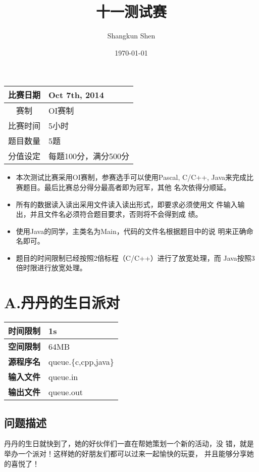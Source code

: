 \documentclass{article}
\title{十一测试赛}
\author{Shangkun Shen}
\date{\today}
\newcommand\artdate{Oct 7th, 2014}
\begin{document}
\maketitle
\begin{longtable}{|c|l|}
 \hline 比赛日期 & \artdate \\
 \hline 赛制 & OI赛制 \\
 \hline 比赛时间 & 5小时 \\
 \hline 题目数量 & 5题 \\
 \hline 分值设定 & 每题100分，满分500分 \\
 \hline
\end{longtable}
\thispagestyle{fancy}
\begin{itemize}
 \item  本次测试比赛采用OI赛制，参赛选手可以使用Pascal, C/C++, 
        Java来完成比赛题目。最后比赛总分得分最高者即为冠军，其他
        名次依得分顺延。
 \item  所有的数据读入读出采用文件读入读出形式，即要求必须使用文
        件输入输出，并且文件名必须符合题目要求，否则将不会得到成
        绩。
 \item  使用Java的同学，主类名为Main，代码的文件名根据题目中的说
        明来正确命名即可。
 \item  题目的时间限制已经按照2倍标程（C/C++）进行了放宽处理，而
        Java按照3倍时限进行放宽处理。
\end{itemize}
\clearpage
\section*{A.丹丹的生日派对}
\begin{longtable}{|c|l|}
 \hline \bfseries{时间限制} & 1s \\
 \hline \bfseries{空间限制} & 64MB \\
 \hline \bfseries{源程序名} & queue.\{c,cpp,java\} \\
 \hline \bfseries{输入文件} & queue.in \\
 \hline \bfseries{输出文件} & queue.out \\
 \hline 
\end{longtable}

\subsection*{问题描述}
丹丹的生日就快到了，她的好伙伴们一直在帮她策划一个新的活动，没
错，就是举办一个派对！这样她的好朋友们都可以过来一起愉快的玩耍，
并且能够分享她的喜悦了！
\end{document}
